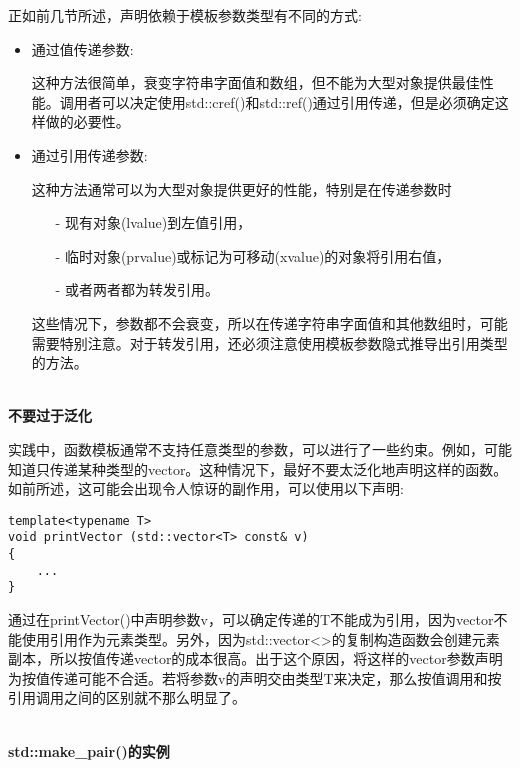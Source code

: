 正如前几节所述，声明依赖于模板参数类型有不同的方式:

\begin{itemize}
\item 
通过值传递参数:

这种方法很简单，衰变字符串字面值和数组，但不能为大型对象提供最佳性能。调用者可以决定使用std::cref()和std::ref()通过引用传递，但是必须确定这样做的必要性。

\item 
通过引用传递参数:

这种方法通常可以为大型对象提供更好的性能，特别是在传递参数时

\begin{itemize}
\item[-]
现有对象(lvalue)到左值引用，

\item[-]
临时对象(prvalue)或标记为可移动(xvalue)的对象将引用右值，

\item[-]
或者两者都为转发引用。
\end{itemize}

这些情况下，参数都不会衰变，所以在传递字符串字面值和其他数组时，可能需要特别注意。对于转发引用，还必须注意使用模板参数隐式推导出引用类型的方法。
\end{itemize}

\hspace*{\fill} \\ %
\noindent
\textbf{不要过于泛化}

实践中，函数模板通常不支持任意类型的参数，可以进行了一些约束。例如，可能知道只传递某种类型的vector。这种情况下，最好不要太泛化地声明这样的函数。如前所述，这可能会出现令人惊讶的副作用，可以使用以下声明:

\begin{lstlisting}[style=styleCXX]
template<typename T>
void printVector (std::vector<T> const& v)
{
	...
}
\end{lstlisting}

通过在printVector()中声明参数v，可以确定传递的T不能成为引用，因为vector不能使用引用作为元素类型。另外，因为std::vector<>的复制构造函数会创建元素副本，所以按值传递vector的成本很高。出于这个原因，将这样的vector参数声明为按值传递可能不合适。若将参数v的声明交由类型T来决定，那么按值调用和按引用调用之间的区别就不那么明显了。

\hspace*{\fill} \\ %
\noindent
\textbf{std::make\_pair()的实例}

